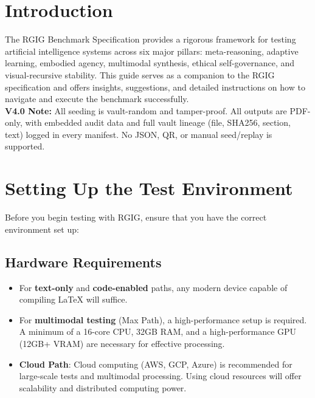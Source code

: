 
\section*{Introduction}
The RGIG Benchmark Specification provides a rigorous framework for testing artificial intelligence systems across six major pillars: meta-reasoning, adaptive learning, embodied agency, multimodal synthesis, ethical self-governance, and visual-recursive stability. This guide serves as a companion to the RGIG specification and offers insights, suggestions, and detailed instructions on how to navigate and execute the benchmark successfully.\\
\textbf{V4.0 Note:} All seeding is vault-random and tamper-proof. All outputs are PDF-only, with embedded audit data and full vault lineage (file, SHA256, section, text) logged in every manifest. No JSON, QR, or manual seed/replay is supported.

\section*{Setting Up the Test Environment}
Before you begin testing with RGIG, ensure that you have the correct environment set up:

\subsection*{Hardware Requirements}
\begin{itemize}
  \item For \textbf{text-only} and \textbf{code-enabled} paths, any modern device capable of compiling \LaTeX{} will suffice.
  \item For \textbf{multimodal testing} (Max Path), a high-performance setup is required. A minimum of a 16-core CPU, 32GB RAM, and a high-performance GPU (12GB+ VRAM) are necessary for effective processing.
  \item \textbf{Cloud Path}: Cloud computing (AWS, GCP, Azure) is recommended for large-scale tests and multimodal processing. Using cloud resources will offer scalability and distributed computing power.
\end{itemize}

